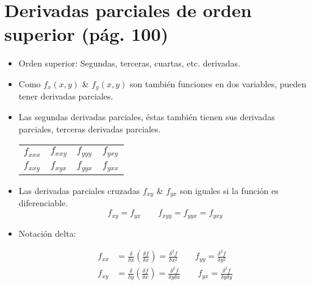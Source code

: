 \section{Derivadas parciales de orden superior (pág. 100)}
\begin{itemize}
    \item Orden superior: Segundas, terceras, cuartas, etc. derivadas.
    \item Como $f_x(x,y)$ \& $f_y(x,y)$ son también funciones en dos variables, pueden tener derivadas parciales.
    
    \item Las segundas derivadas parciales, éstas también tienen sus derivadas parciales, terceras derivadas parciales.
        \begin{center}
           \begin{tabular}{  p{1cm}  p{1cm}  p{1cm}  p{1cm}  }
                    $f_{xxx}$ & $f_{xxy}$ & $f_{yyy}$ & $f_{yxy}$  \\
                    $f_{xxy}$ & $f_{xyx}$ & $f_{yyx}$ & $f_{yxx}$ \\ 
           \end{tabular}
        \end{center}
    
    \item Las derivadas parciales cruzadas $f_{xy}$ \& $f_{yx}$ son iguales si la función es diferenciable.
        \[
          f_{xy} = f_{yx} \quad \quad f_{xyy} = f_{yyx}= f_{yxy}
        \]
    
    \item Notación delta:
        \begin{center}
           \begin{align*}
               f_{xx} &= \frac{\delta }{\delta x} \left(\frac{\delta f}{\delta x}\right) = \frac{\delta^2f}{\delta x^2}  \quad  \quad  f_{yy} = \frac{\delta^2f}{\delta y^2} \\ 
               f_{xy} &= \frac{\delta}{\delta y} \left(\frac{\delta f}{\delta x}\right) = \frac{\delta ^2 f}{\delta y \delta x}  \quad \quad f_{yx} = \frac{\delta^2f}{\delta y \delta y} \\ 
           \end{align*}
        \end{center}
\end{itemize}


